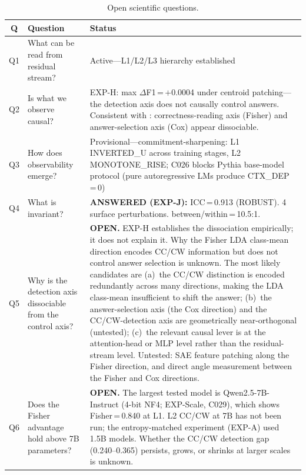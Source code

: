 \documentclass[11pt]{article}
\begin{document}
\begin{table}[h!]
\centering
\caption{Open scientific questions.}
\begin{tabular}{cL{3cm}L{7cm}}
\toprule
Q & Question & Status \\
\midrule
Q1 & What can be read from residual stream? & Active---L1/L2/L3 hierarchy established \\
Q2 & Is what we observe causal? & EXP-H: max $\Delta$F1\,=\,$+$0.0004 under centroid patching---the detection axis does not causally control answers. Consistent with \citet{cox2026decoding}: correctness-reading axis (Fisher) and answer-selection axis (Cox) appear dissociable. \\
Q3 & How does observability emerge? & Provisional---commitment-sharpening: L1 INVERTED\_U across training stages, L2 MONOTONE\_RISE; C026 blocks Pythia base-model protocol (pure autoregressive LMs produce CTX\_DEP\,=\,0) \\
Q4 & What is invariant? & \textbf{ANSWERED (EXP-J):} ICC\,=\,0.913 (ROBUST). 4 surface perturbations. between/within\,=\,10.5:1. \\
\midrule
Q5 & Why is the detection axis dissociable from the control axis? & \textbf{OPEN.} EXP-H establishes the dissociation empirically; it does not explain it. Why the Fisher LDA class-mean direction encodes CC/CW information but does not control answer selection is unknown. The most likely candidates are (a)~the CC/CW distinction is encoded redundantly across many directions, making the LDA class-mean insufficient to shift the answer; (b)~the answer-selection axis (the Cox direction) and the CC/CW-detection axis are geometrically near-orthogonal (untested); (c)~the relevant causal lever is at the attention-head or MLP level rather than the residual-stream level. Untested: SAE feature patching along the Fisher direction, and direct angle measurement between the Fisher and Cox directions. \\
Q6 & Does the Fisher advantage hold above 7B parameters? & \textbf{OPEN.} The largest tested model is Qwen2.5-7B-Instruct (4-bit NF4; EXP-Scale, C029), which shows Fisher\,=\,0.840 at L1. L2 CC/CW at 7B has not been run; the entropy-matched experiment (EXP-A) used 1.5B models. Whether the CC/CW detection gap (0.240--0.365) persists, grows, or shrinks at larger scales is unknown. \\
\bottomrule
\end{tabular}
\end{table}

\end{document}
